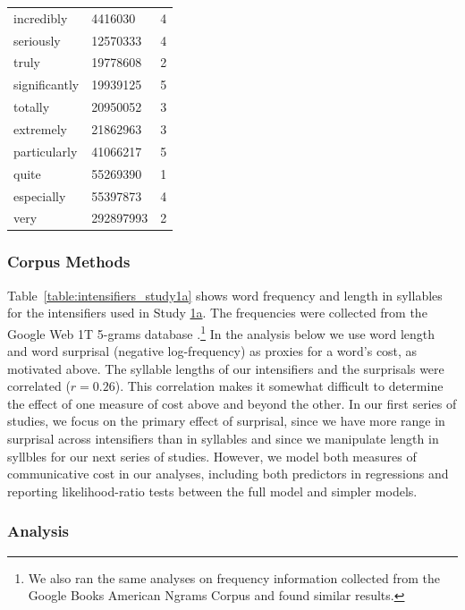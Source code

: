 \documentclass[10pt,letterpaper]{article}
\begin{document}
\begin{table}[ht]
\begin{center}
\begin{tabular}{llc}
    incredibly & 4416030 & 4 \\
    seriously & 12570333 & 4 \\
    truly & 19778608 & 2 \\
    significantly & 19939125 & 5 \\
    totally & 20950052 & 3 \\
    extremely & 21862963 & 3 \\
    particularly & 41066217 & 5 \\
    quite & 55269390 & 1 \\
    especially & 55397873 & 4 \\
    very & 292897993 & 2
  \end{tabular}
 \end{center}
\end{table}

\subsubsection{Corpus Methods}

Table~\ref{table:intensifiers_study1a} shows word frequency and length in syllables for the intensifiers used in Study \hyperref[sec:study1a]{1a}.
The frequencies were collected from the Google Web 1T 5-grams database \cite{brants_web_2006}.\footnote{
  We also ran the same analyses on frequency information collected from the Google Books American Ngrams Corpus \cite{michel_quantitative_2011} and found similar results.
}
In the analysis below we use word length and word surprisal (negative log-frequency) as proxies for a word's cost, as motivated above.
The syllable lengths of our intensifiers and the surprisals were correlated ($r = 0.26$).
This correlation makes it somewhat difficult to determine the effect of one measure of cost above and beyond the other.
In our first series of studies, we focus on the primary effect of surprisal, since we have more range in surprisal across intensifiers than in syllables and since we manipulate length in syllbles for our next series of studies.
However, we model both measures of communicative cost in our analyses, including both predictors in regressions and reporting likelihood-ratio tests between the full model and simpler models.

\subsubsection{Analysis}

\end{document}
